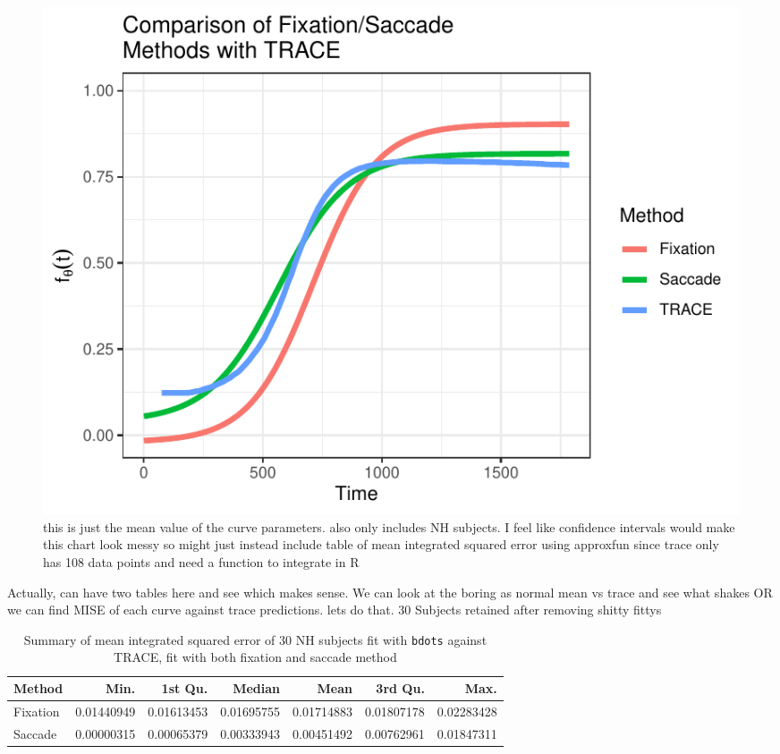 \documentclass{article}
\newcommand{\xt}{\texttt}%
\begin{document}
\begin{figure}[H]
\centering
\includegraphics{sac_fix_trace_compare.pdf}
\caption{this is just the mean value of the curve parameters. also only includes NH subjects. I feel like confidence intervals would make this chart look messy so might just instead include table of mean integrated squared error using approxfun since trace only has 108 data points and need a function to integrate in R}
\end{figure}

Actually, can have two tables here and see which makes sense. We can look at the boring as normal mean vs trace and see what shakes OR we can find MISE of each curve against trace predictions. lets do that. 30 Subjects retained after removing shitty fittys

\begin{table}[ht]
\centering
\begin{tabular}{lrrrrrr}
  \hline
Method & Min. & 1st Qu. & Median & Mean & 3rd Qu. & Max. \\ 
  \hline
Fixation & 0.01440949 & 0.01613453 & 0.01695755 & 0.01714883 & 0.01807178 & 0.02283428 \\ 
  Saccade & 0.00000315 & 0.00065379 & 0.00333943 & 0.00451492 & 0.00762961 & 0.01847311 \\ 
   \hline
\end{tabular}
\caption{Summary of mean integrated squared error of 30 NH subjects fit with \xt{bdots} against TRACE, fit with both fixation and saccade method}
\label{tab:mise_trace}
\end{table}
\end{document}
